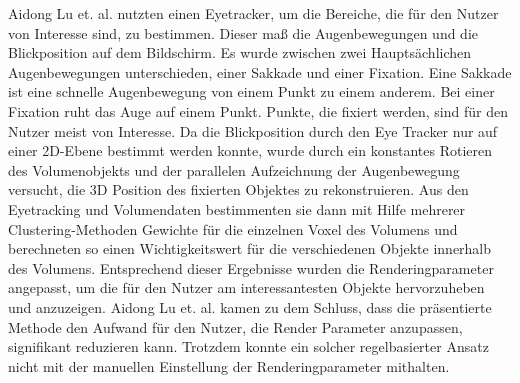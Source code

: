 Aidong Lu et. al. nutzten einen Eyetracker, um die Bereiche, die für den Nutzer von Interesse sind, zu bestimmen.
Dieser maß die Augenbewegungen und die Blickposition auf dem Bildschirm.
Es wurde zwischen zwei Hauptsächlichen Augenbewegungen unterschieden, einer Sakkade und einer Fixation.
Eine Sakkade ist eine schnelle Augenbewegung von einem Punkt zu einem anderem.
Bei einer Fixation ruht das Auge auf einem Punkt.
Punkte, die fixiert werden, sind für den Nutzer meist von Interesse.
Da die Blickposition durch den Eye Tracker nur auf einer 2D-Ebene bestimmt werden konnte, wurde durch ein konstantes Rotieren des Volumenobjekts und der parallelen Aufzeichnung der Augenbewegung versucht, die 3D Position des fixierten Objektes zu rekonstruieren.
Aus den Eyetracking und Volumendaten bestimmenten sie dann mit Hilfe mehrerer Clustering-Methoden Gewichte für die einzelnen Voxel des Volumens und berechneten so einen Wichtigkeitswert für die verschiedenen Objekte innerhalb des Volumens.
Entsprechend dieser Ergebnisse wurden die Renderingparameter angepasst, um die für den Nutzer am interessantesten Objekte hervorzuheben und anzuzeigen.
Aidong Lu et. al. kamen zu dem Schluss, dass die präsentierte Methode den Aufwand für den Nutzer, die Render Parameter anzupassen, signifikant reduzieren kann.
Trotzdem konnte ein solcher regelbasierter Ansatz nicht mit der manuellen Einstellung der Renderingparameter mithalten.

